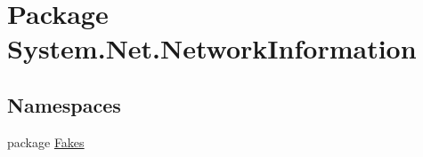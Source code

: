 \hypertarget{namespace_system_1_1_net_1_1_network_information}{\section{Package System.\-Net.\-Network\-Information}
\label{namespace_system_1_1_net_1_1_network_information}
}
\subsection*{Namespaces}
\begin{DoxyCompactItemize}
\item 
package \hyperlink{namespace_system_1_1_net_1_1_network_information_1_1_fakes}{Fakes}
\end{DoxyCompactItemize}
